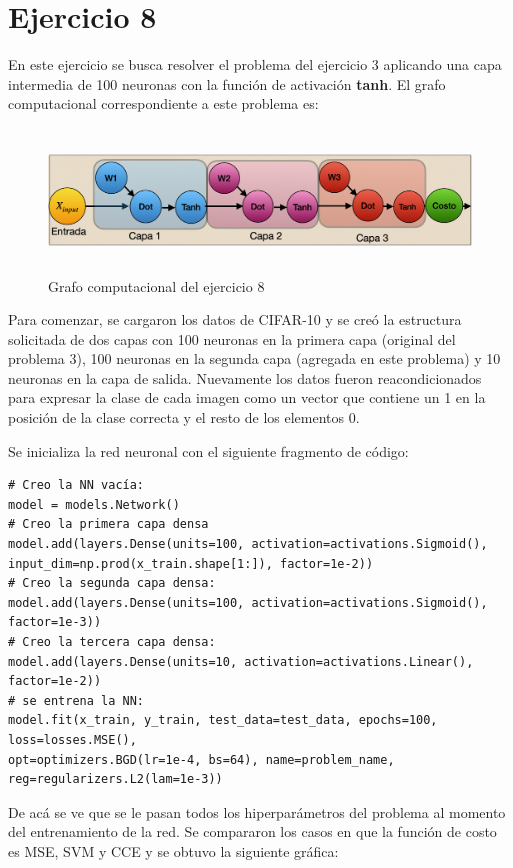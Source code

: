 \section{Ejercicio 8}

En este ejercicio se busca resolver el problema del ejercicio 3 aplicando una capa intermedia de 100 neuronas con la función de activación \textbf{tanh}.
El grafo computacional correspondiente a este problema es:
\begin{figure}[H]
    \centering
    \includegraphics[height=1.5in]{image/EJ8.png}
    \caption{Grafo computacional del ejercicio 8}
    \label{fig:my_label}
\end{figure}


Para comenzar, se cargaron los datos de CIFAR-10 y se creó la estructura solicitada de dos capas con 100 neuronas en la primera capa (original del problema 3), 100 neuronas en la segunda capa (agregada en este problema) y 10 neuronas en la capa de salida.
Nuevamente los datos fueron reacondicionados para expresar la clase de cada imagen como un vector que contiene un 1 en la posición de la clase correcta y el resto de los elementos 0.

Se inicializa la red neuronal con el siguiente fragmento de código:
\begin{verbatim}
# Creo la NN vacía:
model = models.Network()
# Creo la primera capa densa
model.add(layers.Dense(units=100, activation=activations.Sigmoid(), 
input_dim=np.prod(x_train.shape[1:]), factor=1e-2))
# Creo la segunda capa densa:
model.add(layers.Dense(units=100, activation=activations.Sigmoid(), factor=1e-3))  
# Creo la tercera capa densa:
model.add(layers.Dense(units=10, activation=activations.Linear(), factor=1e-2))
# se entrena la NN:
model.fit(x_train, y_train, test_data=test_data, epochs=100, loss=losses.MSE(), 
opt=optimizers.BGD(lr=1e-4, bs=64), name=problem_name, reg=regularizers.L2(lam=1e-3)) 
\end{verbatim}
De acá se ve que se le pasan todos los hiperparámetros del problema al momento del entrenamiento de la red. Se compararon los casos en que la función de costo es MSE, SVM y CCE y se obtuvo la siguiente gráfica:


